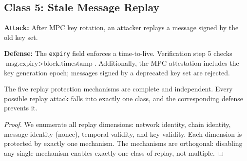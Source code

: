 \subsection{Class 5: Stale Message Replay}

\textbf{Attack:} After MPC key rotation, an attacker replays a message signed by the old key set.

\textbf{Defense:} The \texttt{expiry} field enforces a time-to-live. Verification step 5 checks $\text{msg.expiry} > \text{block.timestamp}$. Additionally, the MPC attestation includes the key generation epoch; messages signed by a deprecated key set are rejected.

\begin{theorem}
The five replay protection mechanisms are complete and independent. Every possible replay attack falls into exactly one class, and the corresponding defense prevents it.
\end{theorem}

\begin{proof}
We enumerate all replay dimensions: network identity, chain identity, message identity (nonce), temporal validity, and key validity. Each dimension is protected by exactly one mechanism. The mechanisms are orthogonal: disabling any single mechanism enables exactly one class of replay, not multiple.
\end{proof}

